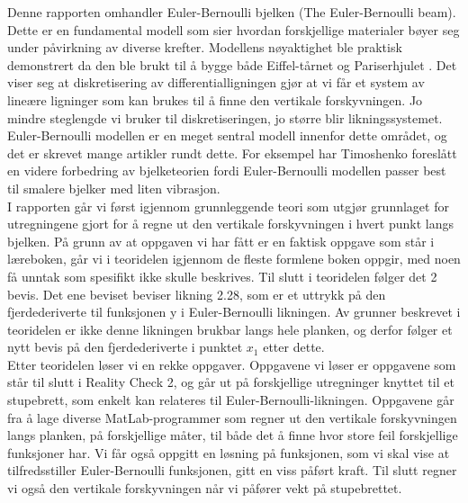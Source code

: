 Denne rapporten omhandler Euler-Bernoulli bjelken (The Euler-Bernoulli beam). Dette er en fundamental modell som sier hvordan forskjellige materialer bøyer seg under påvirkning av diverse krefter. Modellens nøyaktighet ble praktisk demonstrert da den ble brukt til å bygge både Eiffel-tårnet og Pariserhjulet \cite{NdogmoEB}.  Det viser seg at diskretisering av differentialligningen gjør at vi får et system av lineære ligninger som kan brukes til å finne den vertikale forskyvningen. Jo mindre steglengde vi bruker til diskretiseringen, jo større blir likningssystemet. Euler-Bernoulli modellen er en meget sentral modell innenfor dette området, og det er skrevet mange artikler rundt dette. For eksempel har Timoshenko foreslått en videre forbedring av bjelketeorien\cite{Timoshenko} fordi Euler-Bernoulli modellen passer best til smalere bjelker med liten vibrasjon.\\

I rapporten går vi først igjennom grunnleggende teori som utgjør grunnlaget for utregningene gjort for å regne ut den vertikale forskyvningen i hvert punkt langs bjelken. På grunn av at oppgaven vi har fått er en faktisk oppgave som står i læreboken, går vi i teoridelen igjennom de fleste formlene boken oppgir, med noen få unntak som spesifikt ikke skulle beskrives. Til slutt i teoridelen følger det 2 bevis. Det ene beviset beviser likning 2.28, som er et uttrykk på den fjerdederiverte til funksjonen y i Euler-Bernoulli likningen. Av grunner beskrevet i teoridelen er ikke denne likningen brukbar langs hele planken, og derfor følger et nytt bevis på den fjerdederiverte i punktet $x_1$ etter dette. \\

Etter teoridelen løser vi en rekke oppgaver. Oppgavene vi løser er oppgavene som står til slutt i Reality Check 2, og går ut på forskjellige utregninger knyttet til et stupebrett, som enkelt kan relateres til Euler-Bernoulli-likningen. Oppgavene går fra å lage diverse MatLab-programmer som regner ut den vertikale forskyvningen langs planken, på forskjellige måter, til både det å finne hvor store feil forskjellige funksjoner har. Vi får også oppgitt en løsning på funksjonen, som vi skal vise at tilfredsstiller Euler-Bernoulli funksjonen, gitt en viss påført kraft. Til slutt regner vi også den vertikale forskyvningen når vi påfører vekt på stupebrettet. \\ 